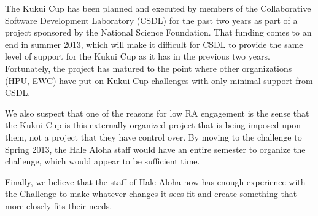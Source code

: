 \documentclass[]{article}
\begin{document}
The Kukui Cup has been planned and executed by members of the Collaborative Software
Development Laboratory (CSDL) for the past two years as part of a project sponsored by the
National Science Foundation.  That funding comes to an end in summer 2013, which will make
it difficult for CSDL to provide the same level of support for the Kukui Cup as it has in
the previous two years.  Fortunately, the project has matured to the point where other
organizations (HPU, EWC) have put on Kukui Cup challenges with only minimal support from
CSDL.

We also suspect that one of the reasons for low RA engagement is the sense that the Kukui
Cup is this externally organized project that is being imposed upon them, not a project
that they have control over.  By moving to the challenge to Spring 2013, the Hale Aloha
staff would have an entire semester to organize the challenge, which would appear to be
sufficient time. 

Finally, we believe that the staff of Hale Aloha now has enough experience with the
Challenge to make whatever changes it sees fit and create something that more closely fits
their needs.  
\end{document}
